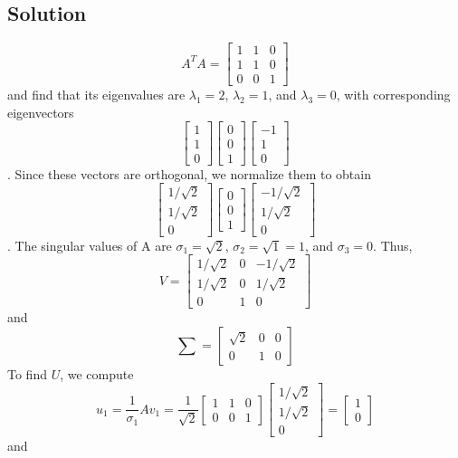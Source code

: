\subsection*{Solution}
$$A^TA = \begin{bmatrix}
    1&1&0\\1&1&0\\0&0&1
\end{bmatrix}$$ and find that its eigenvalues are $\lambda_1 = 2$, $\lambda_2 = 1$, and $\lambda_3 = 0$, with corresponding eigenvectors
$$\begin{bmatrix}
    1\\1\\0
\end{bmatrix}
\begin{bmatrix}
    0\\0\\1
\end{bmatrix} 
\begin{bmatrix}
    -1\\1\\0
\end{bmatrix}$$. Since these vectors are orthogonal, we normalize them to obtain
$$\begin{bmatrix}
    1/\sqrt{2}\\1/\sqrt{2}\\0
\end{bmatrix}
\begin{bmatrix}
    0\\0\\1
\end{bmatrix} 
\begin{bmatrix}
    -1/\sqrt{2}\\1/\sqrt{2}\\0
\end{bmatrix}$$. The singular values of A are $\sigma_1 = \sqrt{2}$, $\sigma_2 = \sqrt{1} = 1$, and $\sigma_3 = 0$. Thus, 
$$V = \begin{bmatrix}
    1/\sqrt{2}&0&-1/\sqrt{2}\\1/\sqrt{2}&0&1/\sqrt{2}\\0&1&0
\end{bmatrix}$$ and $$\sum = \begin{bmatrix}
    \sqrt{2}&0&0\\0&1&0
\end{bmatrix}$$
To find $U$, we compute
$$u_1 = \frac{1}{\sigma_1}Av_1 = \frac{1}{\sqrt{2}}\begin{bmatrix}
    1&1&0\\0&0&1
\end{bmatrix} \begin{bmatrix}
    1/\sqrt{2}\\1/\sqrt{2}\\0
\end{bmatrix} = \begin{bmatrix}
    1\\0
\end{bmatrix}$$ and 
